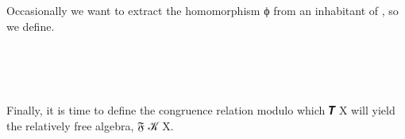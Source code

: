 \ccpad
Occasionally we want to extract the homomorphism \af ϕ from an inhabitant of , so we define.
\ccpad
\begin{code}%
\>[0][@{}l@{\AgdaIndent{1}}]%
\>[1]\<%
\\
%
\>[1]\AgdaSpace{}%
\AgdaSymbol{:}\AgdaSpace{}%
\AgdaSymbol{(}\AgdaSpace{}%
\AgdaSymbol{:}\AgdaSpace{}%
\AgdaSpace{}%
\AgdaSymbol{(}\AgdaSpace{}%
\AgdaSpace{}%
\AgdaSymbol{)}\AgdaSpace{}%
\AgdaSymbol{(}\AgdaSpace{}%
\AgdaSymbol{))(}\AgdaSpace{}%
\AgdaSymbol{:}\AgdaSpace{}%
\AgdaSpace{}%
\AgdaSymbol{)}\<%
\\
\>[1][@{}l@{\AgdaIndent{0}}]%
\>[2]%
\>[6]\AgdaSpace{}%
\AgdaSymbol{(}\AgdaSpace{}%
\AgdaSymbol{)}\AgdaSpace{}%
\AgdaSpace{}%
\AgdaSpace{}%
\<%
\\
%
\>[1]\AgdaSpace{}%
\AgdaSymbol{\AgdaUnderscore{}}\AgdaSpace{}%
\AgdaSpace{}%
\AgdaSymbol{=}\AgdaSpace{}%
\AgdaSpace{}%
\AgdaSpace{}%
\AgdaSpace{}%
\<%
\end{code}
\ccpad
Finally, it is time to define the congruence relation modulo which \af 𝑻 \ab X will yield the relatively free algebra, \af 𝔉 \ab 𝒦 \ab X.

